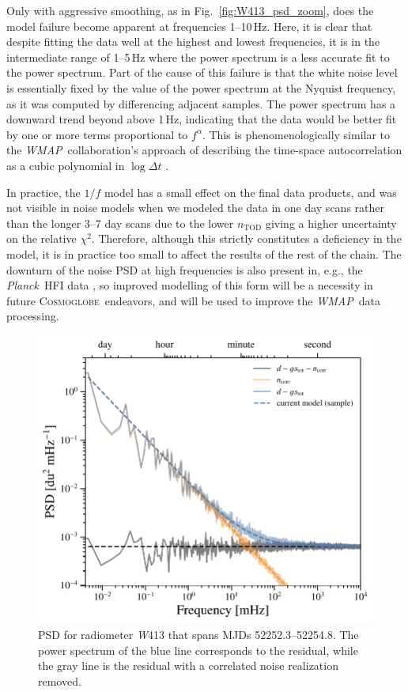 \documentclass[twocolumn]{../../common/aa}
\def\WMAP{\emph{WMAP}}
\def\Planck{\emph{Planck}}
\newcommand{\cosmoglobe}{\textsc{Cosmoglobe}}
\newcommand{\W}[0]{\textit W}
\begin{document}
Only with aggressive smoothing, as in Fig.~\ref{fig:W413_psd_zoom}, does the
model failure become apparent at frequencies 1--10\,Hz.  Here, it is clear that
despite fitting the data well at the highest and lowest frequencies, it is in
the intermediate range of 1--5\,Hz where the power spectrum is a less accurate
fit to the power spectrum. Part of the cause of this failure is that the white
noise level is essentially fixed by the value of the power spectrum at the
Nyquist frequency, as it was computed by differencing adjacent samples. The
power spectrum has a downward trend beyond above 1\,Hz, indicating that the
data would be better fit by one or more terms proportional to $f^\alpha$. This
is phenomenologically similar to the \WMAP\ collaboration's approach of
describing the time-space autocorrelation as a cubic polynomial in $\log\Delta t$ \citep{jarosik2007}.  


In practice, the $1/f$ model has a small effect on the final data products, and
was not visible in noise models when we modeled the data in one day scans
rather than the longer 3--7 day scans due to the lower $n_\mathrm{TOD}$ giving
a higher uncertainty on the relative $\chi^2$.  Therefore, although this
strictly constitutes a deficiency in the model, it is in practice too small to
affect the results of the rest of the chain. The downturn of the noise PSD at
high frequencies is also present in, e.g., the \Planck\ HFI data
\citep[Fig.~1]{planck2014-a10}, so improved modelling of this form will be a
necessity in future \cosmoglobe\ endeavors, and will be used to improve the
\WMAP\ data processing.

\begin{figure}
	\includegraphics[width=\columnwidth]{figures/ps_test_W4_det1.pdf}
	\caption{PSD for radiometer \W413 that spans MJDs 52252.3--52254.8. The power spectrum of the blue line corresponds to the residual, while the gray line is the residual with a correlated noise realization removed.}
	\label{fig:W413_psd}
\end{figure}
\end{document}
